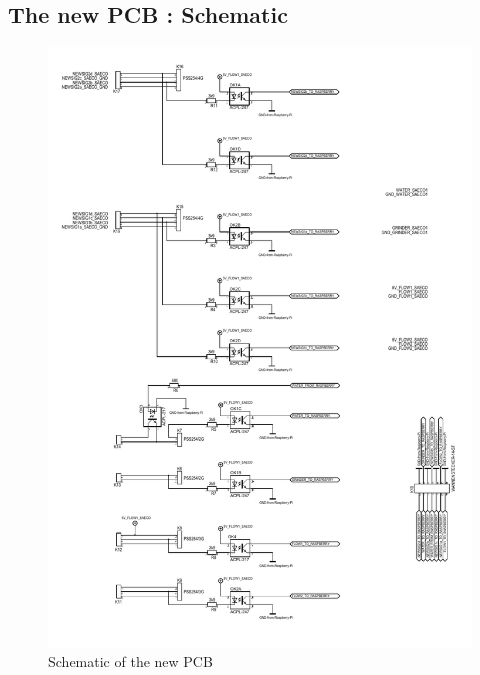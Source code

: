 \documentclass[12pt]{article}
\begin{document}
  \subsection{The new PCB : Schematic}
   \begin{figure}[H]
   \centering
   \includegraphics[width=15cm]{./images/pcbSchematic.pdf}
   \captionsetup{justification=centering}
   \caption{Schematic of the new PCB}
   \label{fig:newPCB}
  \end{figure}
  
\end{document}
